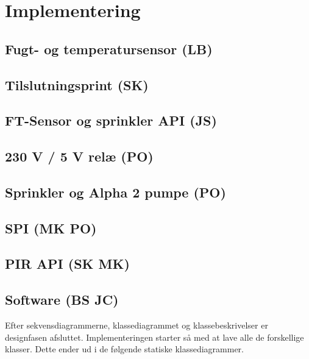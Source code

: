 \chapter{Implementering}

\section{Fugt- og temperatursensor (LB)}


\section{Tilslutningsprint (SK)}


\section{FT-Sensor og sprinkler API (JS)}


\section{230 V / 5 V relæ (PO)}


\section{Sprinkler og Alpha 2 pumpe (PO)}


\newpage
\section{SPI (MK PO)}


\section{PIR API (SK MK)}


\section{Software (BS JC)}
Efter sekvensdiagrammerne, klassediagrammet og klassebeskrivelser er designfasen afsluttet. Implementeringen starter så med at lave alle de forskellige klasser. Dette ender ud i de følgende statiske klassediagrammer.


